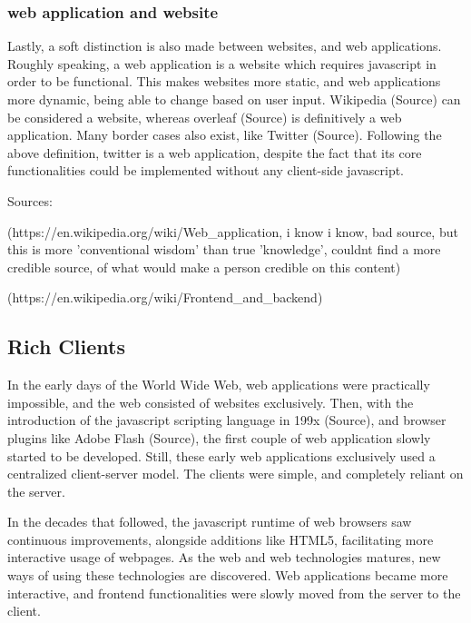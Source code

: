 \subsubsection*{web application and website}

Lastly, a soft distinction is also made between websites, and web applications. 
Roughly speaking, a web application is a website which requires javascript in order to be functional.
This makes websites more static, and web applications more dynamic, being able to change based on user input.  
Wikipedia (Source) can be considered a website, whereas overleaf (Source) is definitively a web application. 
Many border cases also exist, like Twitter (Source).
Following the above definition, twitter is a web application, despite the fact that its core functionalities could be implemented without any client-side javascript.

\begin{note}
  Sources: 

  (https://en.wikipedia.org/wiki/Web_application, i know i know, bad source, but this is more 'conventional wisdom' than true 'knowledge', couldnt find a more credible source, of what would make a person credible on this content)
  
  (https://en.wikipedia.org/wiki/Frontend_and_backend)
\end{note}


\subsection{Rich Clients}
\label{sec:background-web-rich}

In the early days of the World Wide Web, web applications were practically impossible, and the web consisted of websites exclusively. 
Then, with the introduction of the javascript scripting language in 199x (Source), and browser plugins like Adobe Flash (Source), the first couple of web application slowly started to be developed. 
Still, these early web applications exclusively used a centralized client-server model.
The clients were simple, and completely reliant on the server. 

In the decades that followed, the javascript runtime of web browsers saw continuous improvements, alongside additions like HTML5, facilitating more interactive usage of webpages.
As the web and web technologies matures, new ways of using these technologies are discovered.
Web applications became more interactive, and frontend functionalities were slowly moved from the server to the client. 

